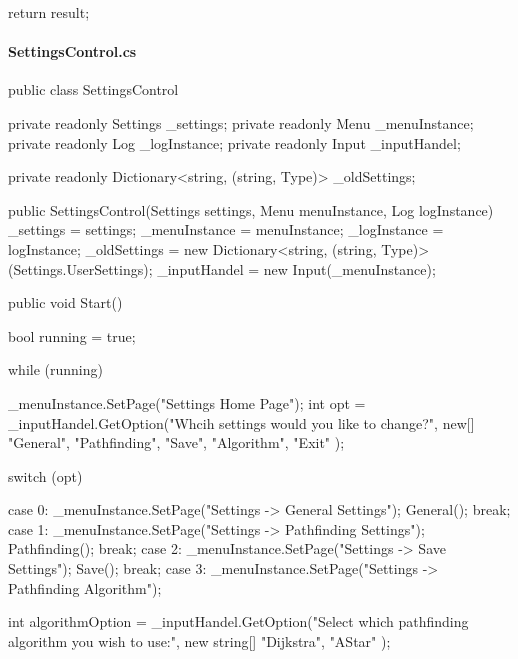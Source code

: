 \begin{flushleft}
\begin{cscode}
{{        return result;
    }

}
    \end{cscode}
    
    \paragraph{SettingsControl.cs}
    \begin{cscode}
public class SettingsControl
{
    private readonly Settings _settings;
    private readonly Menu _menuInstance;
    private readonly Log _logInstance;
    private readonly Input _inputHandel;

    private readonly Dictionary<string, (string, Type)> _oldSettings;

    public SettingsControl(Settings settings, Menu menuInstance, Log logInstance)
    {
        _settings = settings;
        _menuInstance = menuInstance;
        _logInstance = logInstance;
        _oldSettings = new Dictionary<string, (string, Type)>(Settings.UserSettings);
        _inputHandel = new Input(_menuInstance);
    }

    public void Start()
    {
        bool running = true;

        while (running)
        {
            _menuInstance.SetPage("Settings Home Page");
            int opt = _inputHandel.GetOption("Whcih settings would you like to change?",
                new[]
                {
                    "General",
                    "Pathfinding",
                    "Save",
                    "Algorithm",
                    "Exit"
                }
            );

            switch (opt)
            {
                case 0:
                    _menuInstance.SetPage("Settings -> General Settings");
                    General();
                    break;
                case 1:
                    _menuInstance.SetPage("Settings -> Pathfinding Settings");
                    Pathfinding();
                    break;
                case 2:
                    _menuInstance.SetPage("Settings -> Save Settings");
                    Save();
                    break;
                case 3:
                    _menuInstance.SetPage("Settings -> Pathfinding Algorithm");

                    int algorithmOption = _inputHandel.GetOption("Select which pathfinding algorithm you wish to use:", new string[] {
                        "Dijkstra",
                        "AStar"
                    });

}}}}
\end{cscode}
\end{flushleft}
